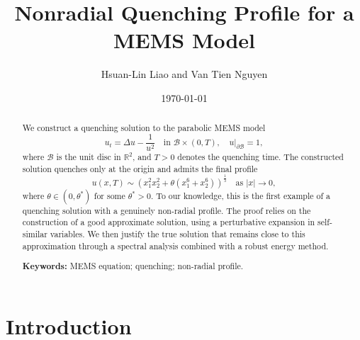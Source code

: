 \documentclass[11pt,reqno]{amsart}
\theoremstyle{definition}
\theoremstyle{bfremark}
\numberwithin{equation}{section}
\begin{document}
\title{Nonradial Quenching Profile for a MEMS Model} 
\author{Hsuan-Lin Liao and Van Tien Nguyen}
\date{\today}
\address{Hsuan-Lin Liao, Department of Mathematics, National Taiwan University.}

\address{Van Tien Nguyen, Department of Mathematics, Institute of Applied Mathematical Sciences, National Taiwan University.}
\maketitle

\let\thefootnote\relax
{}

\begin{abstract}
We construct a quenching solution to the parabolic MEMS model
\[
u_t = \Delta u - \frac{1}{u^2} \quad \text{in } \mathcal{B} \times (0,T), \quad u|_{\partial \mathcal{B}} = 1,
\]
where \(\mathcal{B}\) is the unit disc in \(\mathbb{R}^2\), and \(T > 0\) denotes the quenching time.  The constructed solution quenches only at the origin and admits the final profile
\[
u(x,T) \sim \left(x_1^2 x_2^2 + \theta(x_1^6 + x_2^6)\right)^{\frac{1}{3}} \quad \text{as } |x| \to 0,
\]
where $\theta \in (0, \theta^*)$ for some $\theta^* > 0$. To our knowledge, this is the first example of a quenching solution with a genuinely non-radial profile. The proof relies on the construction of a good approximate solution, using a perturbative expansion in self-similar variables. We then justify the true solution that remains close to this approximation through a spectral analysis combined with a robust energy method.

\medskip
\noindent\textbf{Keywords:} MEMS equation; quenching; non-radial profile. 
\end{abstract}



\section{Introduction}
\label{section1}
\end{document}
